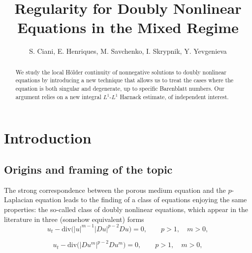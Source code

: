 \documentclass[a4paper,11pt,fullpage]{article}
\numberwithin{equation}{section}
\begin{document}
\title{Regularity for Doubly Nonlinear Equations in the Mixed Regime
}

\author{S. Ciani, E. Henriques, M. Savchenko, I. Skrypnik, Y. Yevgenieva}


\maketitle   

\begin{abstract} \noindent We study the local H\"older continuity of nonnegative solutions to doubly nonlinear equations by introducing a new technique that allows us to treat the cases where the equation is both singular and degenerate, up to specific Barenblatt numbers. Our argument relies on a new integral $L^1$-$L^1$ Harnack estimate, of independent interest. 
\end{abstract}




	


\pagestyle{myheadings} \thispagestyle{plain}


\section{Introduction}\label{Introduction}

\subsection{Origins and framing of the topic}

The strong correspondence between the porous medium equation
and the $p$-Laplacian equation leads to the finding of a class of
equations enjoying the same properties: the so-called class of
 doubly nonlinear equations, which appear in the literature in three (somehow equivalent) forms
\begin{equation}\label{dnleq1}
u_t-\textrm{div} \big(|u|^{m-1} |Du|^{p-2} Du\big)=0 , \qquad p>1, \quad m>0 ,
\end{equation}

\begin{equation}\label{eq1.0}
u_t-\textrm{div} \big(|Du^m|^{p-2} Du^m \big)=0 , \qquad p>1, \quad m>0 ,
\end{equation}
\end{document}
